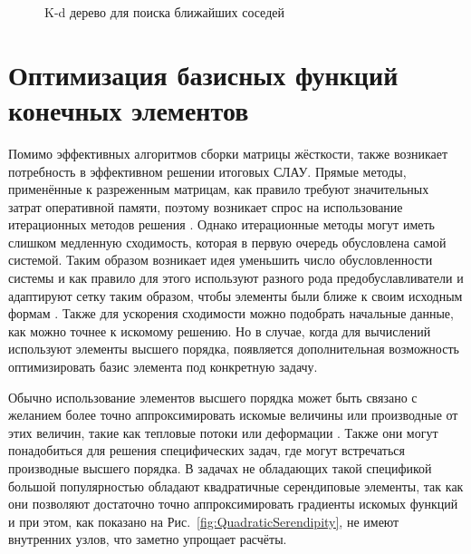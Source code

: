 \begin{figure}[ht]
    \caption{K-d дерево для поиска ближайших соседей}\label{fig:SearchNeighbours}
\end{figure}

\section{Оптимизация базисных функций конечных элементов}\label{sec:ProgramComplex/BasisOptimization}

Помимо эффективных алгоритмов сборки матрицы жёсткости, также возникает потребность в эффективном решении итоговых СЛАУ. Прямые методы, применённые к разреженным матрицам, как правило требуют значительных затрат оперативной памяти, поэтому возникает спрос на использование итерационных методов решения \cite{Demmel}. Однако итерационные методы могут иметь слишком медленную сходимость, которая в первую очередь обусловлена самой системой. Таким образом возникает идея уменьшить число обусловленности системы и как правило для этого используют разного рода предобуславливатели и адаптируют сетку таким образом, чтобы элементы были ближе к своим исходным формам \cite{MeshOptimization1, MeshOptimization2}. Также для ускорения сходимости можно подобрать начальные данные, как можно точнее к искомому решению. Но в случае, когда для вычислений используют элементы высшего порядка, появляется дополнительная возможность оптимизировать базис элемента под конкретную задачу.

Обычно использование элементов высшего порядка может быть связано с желанием более точно аппроксимировать искомые величины или производные от этих величин, такие как тепловые потоки или деформации \cite{HighOrderElements1, HighOrderElements2}. Также они могут понадобиться для решения специфических задач, где могут встречаться производные высшего порядка. В задачах не обладающих такой спецификой большой популярностью обладают квадратичные серендиповые элементы, так как они позволяют достаточно точно аппроксимировать градиенты искомых функций и при этом, как показано на Рис.~\ref{fig:QuadraticSerendipity}, не имеют внутренних узлов, что заметно упрощает расчёты.


